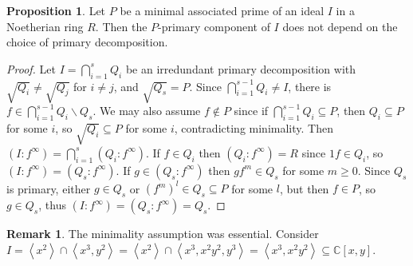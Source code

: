 \documentclass[a4paper]{article}
\newcommand{\la}{\left\langle}
\newcommand{\ra}{\right\rangle}
\newcommand{\C}{\mathbb C}
\theoremstyle{definition}
\newtheorem{prop}[defn]{Proposition}
\newtheorem*{remark}{Remark}
\begin{document}
\begin{prop}
Let $P$ be a minimal associated prime of an ideal $I$ in a Noetherian ring $R$. Then the $P$-primary component of $I$ does not depend on the choice of primary decomposition.
\end{prop}

\begin{proof}
Let $I=\bigcap_{i=1}^s Q_i$ be an irredundant primary decomposition with $\sqrt{Q_i}\neq\sqrt{Q_j}$ for $i\neq j$, and $\sqrt{Q_s}=P$. Since $\bigcap_{i=1}^{s-1} Q_i\neq I$, there is $f\in \bigcap_{i=1}^{s-1} Q_i\backslash Q_s$. We may also assume $f\notin P$ since if $\bigcap_{i=1}^{s-1} Q_i\subseteq P$, then $Q_i\subseteq P$ for some $i$, so $\sqrt{Q_i}\subseteq P$ for some $i$, contradicting minimality. Then $(I:f^\infty)=\bigcap_{i=1}^s (Q_i:f^\infty)$. If $f\in Q_i$ then $(Q_i:f^\infty)=R$ since $1f\in Q_i$, so $(I:f^\infty)=(Q_s:f^\infty)$. If $g\in(Q_s:f^\infty)$ then $gf^m\in Q_s$ for some $m\geq 0$. Since $Q_s$ is primary, either $g\in Q_s$ or $(f^m)^l\in Q_s\subseteq P$ for some $l$, but then $f\in P$, so $g\in Q_s$, thus $(I:f^\infty)=(Q_s:f^\infty)=Q_s$.
\end{proof}

\begin{remark}
The minimality assumption was essential. Consider $I=\la x^2\ra\cap\la x^3,y^2\ra=\la x^2\ra\cap \la x^3,x^2y^2,y^3\ra=\la x^3,x^2y^2\ra\subseteq \C[x,y]$.
\end{remark}
\end{document}
